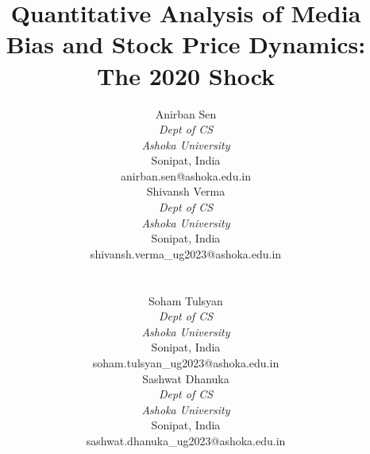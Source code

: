 \documentclass[conference]{IEEEtran}
\begin{document}
\title{Quantitative Analysis of Media Bias and Stock Price Dynamics: The 2020 Shock}

\author{\small
\begin{minipage}[t]{0.48\textwidth}
\centering
Anirban Sen \\
\textit{Dept of CS} \\
\textit{Ashoka University} \\
Sonipat, India \\
anirban.sen@ashoka.edu.in
\end{minipage}
\hfill
\begin{minipage}[t]{0.48\textwidth}
\centering
Shivansh Verma \\
\textit{Dept of CS} \\
\textit{Ashoka University} \\
Sonipat, India \\
shivansh.verma\_ug2023@ashoka.edu.in
\end{minipage}
\\[0.6em]
\begin{minipage}[t]{0.48\textwidth}
\centering
Soham Tulsyan \\
\textit{Dept of CS} \\
\textit{Ashoka University} \\
Sonipat, India \\
soham.tulsyan\_ug2023@ashoka.edu.in
\end{minipage}
\hfill
\begin{minipage}[t]{0.48\textwidth}
\centering
Sashwat Dhanuka \\
\textit{Dept of CS} \\
\textit{Ashoka University} \\
Sonipat, India \\
sashwat.dhanuka\_ug2023@ashoka.edu.in
\end{minipage}
}

\maketitle

\thispagestyle{empty}
\end{document}
